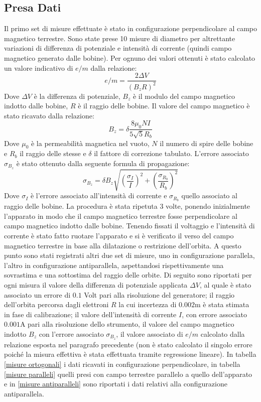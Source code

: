\documentclass{article}
\begin{document}
\subsection{Presa Dati}
    Il primo set di misure effettuate è stato in configurazione perpendicolare al campo magnetico terrestre. Sono state prese 10 misure di diametro per altrettante variazioni di differenza di potenziale e intensità di corrente (quindi campo magnetico generato dalle bobine). Per ognuno dei valori ottenuti è stato calcolato un valore indicativo di $e/m$ dalla relazione:
        \[ e/m = \frac{2\Delta V}{(B_z R)^2}\]
    Dove $\Delta V$ è la differenza di potenziale, $B_z$ è il modulo del campo magnetico indotto dalle bobine, $R$ è il raggio delle bobine. Il valore del campo magnetico è stato ricavato dalla relazione: 
        \[B_z=\delta \frac{8\mu_0 N I }{5\sqrt{5} R_b}\]
    Dove $\mu_0$ è la permeabilità magnetica nel vuoto, $N$ il numero di spire delle bobine e $R_b$ il raggio delle stesse e $\delta$ il fattore di correzione tabulato. L'errore associato $\sigma_{B_z}$ è stato ottenuto dalla seguente formula di propagazione:
    \[\sigma_{B_z} = \delta B_z \sqrt{(\frac{\sigma_I}{I})^2 + (\frac{\sigma_{R_b}}{R_b})^2}\]
    Dove $\sigma_I$ è l'errore associato all'intensità di corrente e $\sigma_{R_b}$ quello associato al raggio delle bobine.
    La procedura è stata ripetuta 3 volte, ponendo inizialmente l'apparato in modo che il campo magnetico terrestre fosse perpendicolare al campo magnetico indotto dalle bobine. Tenendo fissati il voltaggio e l'intensità di corrente è stato fatto ruotare l'apparato e si è verificato il verso del campo magnetico terrestre in base alla dilatazione o restrizione dell'orbita. A questo punto sono stati registrati altri due set di misure, uno in configurazione parallela, l'altro in configurazione antiparallela, aspettandosi rispettivamente una sovrastima e una sottostima del raggio delle orbite. Di seguito sono riportati per ogni misura il valore della differenza di potenziale applicata $\Delta V$, al quale è stato associato un errore di $0.1$ Volt pari alla risoluzione del generatore; il raggio dell'orbita percorsa dagli elettroni $R$ la cui incertezza di $0.002$m è stata stimata in fase di calibrazione; il valore dell'intensità di corrente $I$, con errore associato $0.001$A pari alla risoluzione dello strumento, il valore del campo magnetico indotto $B_z$ con l'errore associato $\sigma_{B_z}$, il valore associato di $e/m$ calcolato dalla relazione esposta nel paragrafo precedente (non è stato calcolato il singolo errore poiché la misura effettiva è stata effettuata tramite regressione lineare). In tabella \ref{misure ortogonali} i dati ricavati in configurazione perpendicolare, in tabella \ref{misure paralleli} quelli presi con campo terrestre parallelo a quello dell'apparato e in \ref{misure antiparalleli} sono riportati i dati relativi alla configurazione antiparallela. 
    
\end{document}
